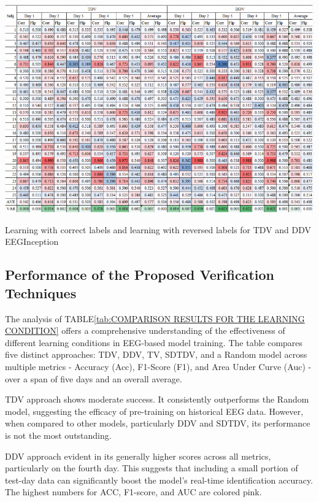    \begin{table}[tb]
    \centering
    \includegraphics[width=\linewidth]{Flipdata.png}
    \caption{Learning with correct labels and learning with reversed labels for TDV and DDV EEGInception}
    \label{tab: Learning with correct labels and learning with reversed labels for TDV and DDV EEGInception}
    \end{table}
    \subsection{Performance of the Proposed Verification Techniques}
    The analysis of TABLE\ref{tab:COMPARISON RESULTS FOR THE LEARNING CONDITION} offers a comprehensive understanding of the effectiveness of different learning conditions in EEG-based model training. The table compares five distinct approaches: TDV, DDV, TV, SDTDV, and a Random model across multiple metrics - Accuracy (Acc), F1-Score (F1), and Area Under Curve (Auc) - over a span of five days and an overall average.

    TDV approach shows moderate success. It consistently outperforms the Random model, suggesting the efficacy of pre-training on historical EEG data. However, when compared to other models, particularly DDV and SDTDV, its performance is not the most outstanding.
        
    DDV approach evident in its generally higher scores across all metrics, particularly on the fourth day. This suggests that including a small portion of test-day data can significantly boost the model's real-time identification accuracy. The highest numbers for ACC, F1-score, and AUC are colored pink.
        
